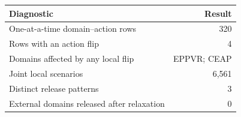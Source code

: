 \begin{tabular}{lr}
\toprule
Diagnostic & Result \\
\midrule
One-at-a-time domain--action rows & 320 \\
Rows with an action flip & 4 \\
Domains affected by any local flip & EPPVR; CEAP \\
Joint local scenarios & 6,561 \\
Distinct release patterns & 3 \\
External domains released after relaxation & 0 \\
\bottomrule
\end{tabular}
